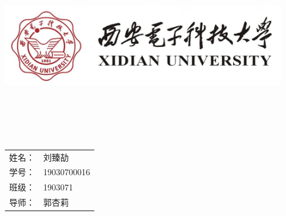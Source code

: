 \begin{titlepage}
	\newcommand{\ID}{{\Large 000000000}}
	\newcommand{\supervisor}{{\Large 李田所}}
	\newcommand{\class}{{\Large 班级}}
    
	\center
	\quad\\[1cm]
	\includegraphics[width=12cm]{Content/西安电子科技大学-logo.jpg}\\[2cm]
	
	\quad\\[1cm]
	\makeatletter
	
	{\linespread{4}\Huge\bfseries\@title}\\[1cm]
	\begin{table}[H]
		\centering
		\subtitle{\textsf {基于图论与深度学习的协同过滤推荐方法对比}}\\[2.5cm]
		  \begin{tabular}{rl}
			{\Large 姓名：}&{\Large 刘臻劼}\\[0.5cm]
			{\Large 学号：}&{\Large 19030700016}\\[0.5cm]
			{\Large 班级：}&{\Large 1903071}\\[0.5cm]
			{\Large 导师：}&{\Large 郭杏莉}
		  \end{tabular}\\
	\end{table}
	\makeatother
	\quad\\[1cm]
	\vfill 
\end{titlepage}